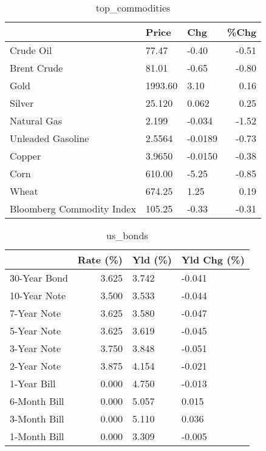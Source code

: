 \documentclass{article}%
\begin{document}
\begin{table}[htbp]%
\caption{top\_commodities}%
\centering%
\begin{adjustbox}{width=1\textwidth}%
\begin{tabular}{lllr}
\toprule
                          &   Price &     Chg &  \%Chg \\
\midrule
               Crude Oil  &   77.47 &   -0.40 & -0.51 \\
             Brent Crude  &   81.01 &   -0.65 & -0.80 \\
                    Gold  & 1993.60 &    3.10 &  0.16 \\
                  Silver  &  25.120 &   0.062 &  0.25 \\
             Natural Gas  &   2.199 &  -0.034 & -1.52 \\
       Unleaded Gasoline  &  2.5564 & -0.0189 & -0.73 \\
                  Copper  &  3.9650 & -0.0150 & -0.38 \\
                    Corn  &  610.00 &   -5.25 & -0.85 \\
                   Wheat  &  674.25 &    1.25 &  0.19 \\
Bloomberg Commodity Index &  105.25 &   -0.33 & -0.31 \\
\bottomrule
\end{tabular}
%
\end{adjustbox}%
\end{table}

%


\begin{table}[htbp]%
\caption{us\_bonds}%
\centering%
\begin{adjustbox}{width=1\textwidth}%
\begin{tabular}{lrll}
\toprule
             &  Rate (\%) & Yld (\%) & Yld Chg (\%) \\
\midrule
30-Year Bond &     3.625 &   3.742 &      -0.041 \\
10-Year Note &     3.500 &   3.533 &      -0.044 \\
 7-Year Note &     3.625 &   3.580 &      -0.047 \\
 5-Year Note &     3.625 &   3.619 &      -0.045 \\
 3-Year Note &     3.750 &   3.848 &      -0.051 \\
 2-Year Note &     3.875 &   4.154 &      -0.021 \\
 1-Year Bill &     0.000 &   4.750 &      -0.013 \\
6-Month Bill &     0.000 &   5.057 &       0.015 \\
3-Month Bill &     0.000 &   5.110 &       0.036 \\
1-Month Bill &     0.000 &   3.309 &      -0.005 \\
\bottomrule
\end{tabular}
%
\end{adjustbox}%
\end{table}
\end{document}
